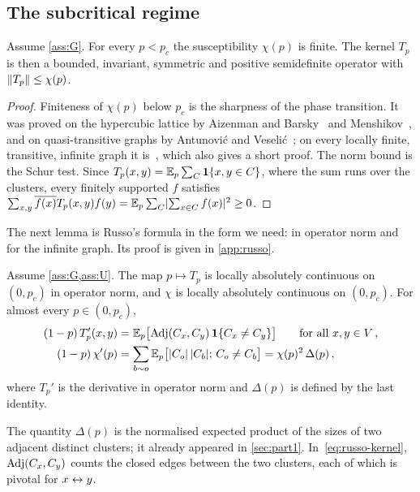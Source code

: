 \subsection{The subcritical regime}\label{sec:subcritical}

\begin{lemma}\label{lem:subcritical}
Assume \cref{ass:G}. For every $p<p_c$ the susceptibility $\chi(p)$ is finite. The kernel $T_p$ is then
a bounded, invariant, symmetric and positive semidefinite operator with $\lVert T_p\rVert\le\chi(p)$.
\end{lemma}

\begin{proof}
Finiteness of $\chi(p)$ below $p_c$ is the sharpness of the phase transition. It was proved on the
hypercubic lattice by Aizenman and Barsky~\cite{AB87} and Menshikov~\cite{Men86}, and on quasi-transitive
graphs by Antunovi\'c and Veseli\'c~\cite[Theorem~2]{AV08}; on every locally finite, transitive, infinite
graph it is~\cite[Theorem~1.1]{DCT16}, which also gives a short proof. The norm bound is the Schur test. Since
$T_p(x,y)=\mathbb E_p\sum_C\mathbf{1}\{x,y\in C\}$, where the sum runs over the clusters, every finitely supported $f$
satisfies $\sum_{x,y}\overline{f(x)}T_p(x,y)f(y)=\mathbb E_p\sum_C\lvert\sum_{x\in C}f(x)\rvert^2\ge0$.
\end{proof}

The next lemma is Russo's formula in the form we need: in operator norm and for the infinite graph. Its
proof is given in \cref{app:russo}.

\begin{lemma}\label{lem:russo}
Assume \cref{ass:G,ass:U}. The map $p\mapsto T_p$ is locally absolutely continuous on $(0,p_c)$ in
operator norm, and $\chi$ is locally absolutely continuous on $(0,p_c)$. For almost every $p\in(0,p_c)$,
\begin{align}
  (1-p)\,T_p'(x,y)&=\mathbb E_p\bigl[\operatorname{Adj}(C_x,C_y)\,\mathbf{1}\{C_x\neq C_y\}\bigr]\qquad\text{for all }x,y\in V\,,
  \label{eq:russo-kernel}\\
  (1-p)\,\chi'(p)&=\sum_{b\sim o}\mathbb E_p\bigl[\lvert C_o\rvert\,\lvert C_b\rvert;\,C_o\neq C_b\bigr]
  =\chi(p)^2\,\Delta(p)\,,\label{eq:russo-chi}
\end{align}
where $T_p'$ is the derivative in operator norm and $\Delta(p)$ is defined by the last identity.
\end{lemma}

The quantity $\Delta(p)$ is the normalised expected product of the sizes of two adjacent distinct
clusters; it already appeared in \cref{sec:part1}. In~\eqref{eq:russo-kernel}, $\operatorname{Adj}(C_x,C_y)$ counts
the closed edges between the two clusters, each of which is pivotal for $x\leftrightarrow y$.

